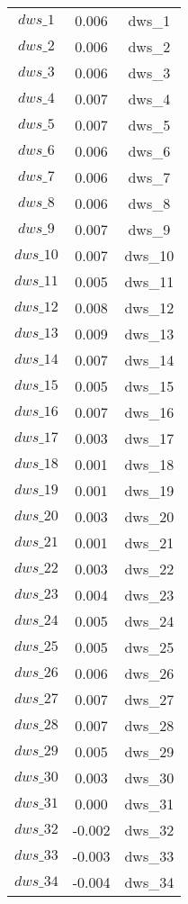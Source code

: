 \begin{center}
\begin{longtable}{ccc}
$dws\_1$ 	 & 	 0.006 	 & 	 dws\_1\\
$dws\_2$ 	 & 	 0.006 	 & 	 dws\_2\\
$dws\_3$ 	 & 	 0.006 	 & 	 dws\_3\\
$dws\_4$ 	 & 	 0.007 	 & 	 dws\_4\\
$dws\_5$ 	 & 	 0.007 	 & 	 dws\_5\\
$dws\_6$ 	 & 	 0.006 	 & 	 dws\_6\\
$dws\_7$ 	 & 	 0.006 	 & 	 dws\_7\\
$dws\_8$ 	 & 	 0.006 	 & 	 dws\_8\\
$dws\_9$ 	 & 	 0.007 	 & 	 dws\_9\\
$dws\_10$ 	 & 	 0.007 	 & 	 dws\_10\\
$dws\_11$ 	 & 	 0.005 	 & 	 dws\_11\\
$dws\_12$ 	 & 	 0.008 	 & 	 dws\_12\\
$dws\_13$ 	 & 	 0.009 	 & 	 dws\_13\\
$dws\_14$ 	 & 	 0.007 	 & 	 dws\_14\\
$dws\_15$ 	 & 	 0.005 	 & 	 dws\_15\\
$dws\_16$ 	 & 	 0.007 	 & 	 dws\_16\\
$dws\_17$ 	 & 	 0.003 	 & 	 dws\_17\\
$dws\_18$ 	 & 	 0.001 	 & 	 dws\_18\\
$dws\_19$ 	 & 	 0.001 	 & 	 dws\_19\\
$dws\_20$ 	 & 	 0.003 	 & 	 dws\_20\\
$dws\_21$ 	 & 	 0.001 	 & 	 dws\_21\\
$dws\_22$ 	 & 	 0.003 	 & 	 dws\_22\\
$dws\_23$ 	 & 	 0.004 	 & 	 dws\_23\\
$dws\_24$ 	 & 	 0.005 	 & 	 dws\_24\\
$dws\_25$ 	 & 	 0.005 	 & 	 dws\_25\\
$dws\_26$ 	 & 	 0.006 	 & 	 dws\_26\\
$dws\_27$ 	 & 	 0.007 	 & 	 dws\_27\\
$dws\_28$ 	 & 	 0.007 	 & 	 dws\_28\\
$dws\_29$ 	 & 	 0.005 	 & 	 dws\_29\\
$dws\_30$ 	 & 	 0.003 	 & 	 dws\_30\\
$dws\_31$ 	 & 	 0.000 	 & 	 dws\_31\\
$dws\_32$ 	 & 	 -0.002 	 & 	 dws\_32\\
$dws\_33$ 	 & 	 -0.003 	 & 	 dws\_33\\
$dws\_34$ 	 & 	 -0.004 	 & 	 dws\_34\\

\end{longtable}
\end{center}
